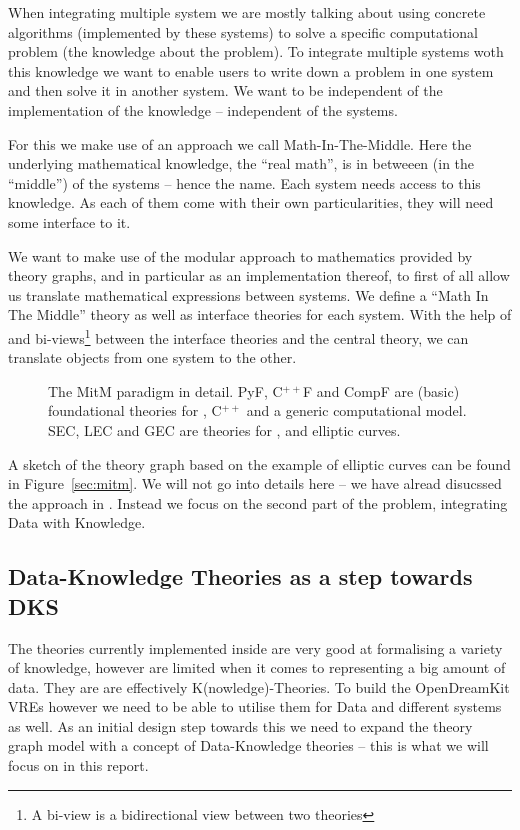 When integrating multiple system we are mostly talking about using concrete algorithms
(implemented by these systems) to solve a specific computational problem (the knowledge
about the problem). To integrate multiple systems woth this knowledge we want to enable
users to write down a problem in one system and then solve it in another system. We want
to be independent of the implementation of the knowledge -- independent of the systems.

For this we make use of an approach we call Math-In-The-Middle. Here the underlying
mathematical knowledge, the ``real math'', is in betweeen (in the ``middle'') of the
systems -- hence the name. Each system needs access to this knowledge. As each of them
come with their own particularities, they will need some interface to it.

We want to make use of the modular approach to mathematics provided by theory graphs, and
in particular \MMT as an implementation thereof, to first of all allow us translate
mathematical expressions between systems. We define a ``Math In The Middle'' theory as
well as interface theories for each system. With the help of \MMT and bi-views\footnote{A
  bi-view is a bidirectional view between two theories} between the interface theories and
the central theory, we can translate objects from one system to the other.

\begin{figure}[ht]\centering
  \def\myxscale{3}\def\myyscale{1.2}
  
  \caption{The MitM paradigm in detail. PyF, C${}^{++}$F and CompF are (basic)
    foundational theories for \python, C${}^{++}$ and a generic computational model. SEC,
    LEC and GEC are theories for \SageMath, \LMFDB and \GAP elliptic curves.}\label{fig:mitm}
\end{figure}

A sketch of the theory graph based on the example of elliptic curves can be found in
Figure~\ref{sec:mitm}. We will not go into details here -- we have alread disucssed the
approach in \cite{DehKohKon:iop16}. Instead we focus on the second part of the problem,
integrating Data with Knowledge.

\subsection{Data-Knowledge Theories as a step towards DKS}\label{sec:introfinal}

The theories currently implemented inside \MMT are very good at formalising a variety of
knowledge, however are limited when it comes to representing a big amount of data. They
are are effectively K(nowledge)-Theories. To build the OpenDreamKit VREs however we need
to be able to utilise them for Data and different systems as well. As an initial design
step towards this we need to expand the theory graph model with a concept of
Data-Knowledge theories -- this is what we will focus on in this report.


